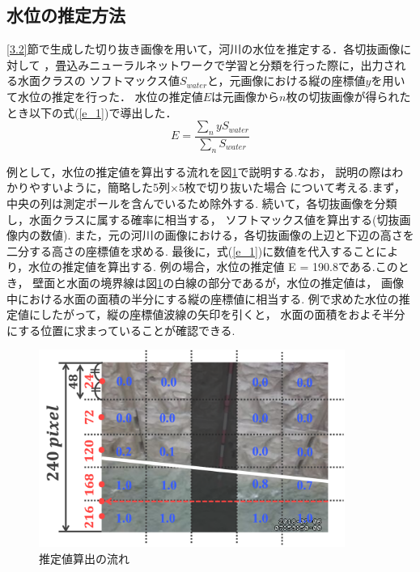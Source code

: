 \clearpage
  
\label{3.3}
\subsection{水位の推定方法}
\ref{3.2}節で生成した切り抜き画像を用いて，河川の水位を推定する．各切抜画像に対して
，畳込みニューラルネットワークで学習と分類を行った際に，出力される水面クラスの
ソフトマックス値$S_{water}$と，元画像における縦の座標値$y$を用いて水位の推定を行った．
水位の推定値$E$は元画像から$n$枚の切抜画像が得られたとき以下の式(\ref{e_1})で導出した．
\vspace{5mm}
\begin{equation}
  \label{e_1}
  E=\frac{\sum_{n} y S_{water}}{\sum_{n} S_{water}}
\end{equation}
\vspace{3mm}

例として，水位の推定値を算出する流れを図\ref{suii}で説明する.なお，
説明の際はわかりやすいように，簡略した5列×5枚で切り抜いた場合
について考える.まず，中央の列は測定ポールを含んでいるため除外する.
続いて，各切抜画像を分類し，水面クラスに属する確率に相当する，
ソフトマックス値を算出する(切抜画像内の数値).
また，元の河川の画像における，各切抜画像の上辺と下辺の高さを二分する高さの座標値を求める.
最後に，式(\ref{e_1})に数値を代入することにより，水位の推定値を算出する.
例の場合，水位の推定値 E = 190.8である.このとき，
壁面と水面の境界線は図\ref{suii}の白線の部分であるが，水位の推定値は，
画像中における水面の面積の半分にする縦の座標値に相当する.
例で求めた水位の推定値にしたがって，縦の座標値波線の矢印を引くと，
水面の面積をおよそ半分にする位置に求まっていることが確認できる.
\vspace{3mm}
\begin{figure}[h] 
  \begin{center}
    \includegraphics[width=100mm]{figs/suii.png}
    \end{center}
    \caption{推定値算出の流れ}
    \label{suii}
\end{figure}

